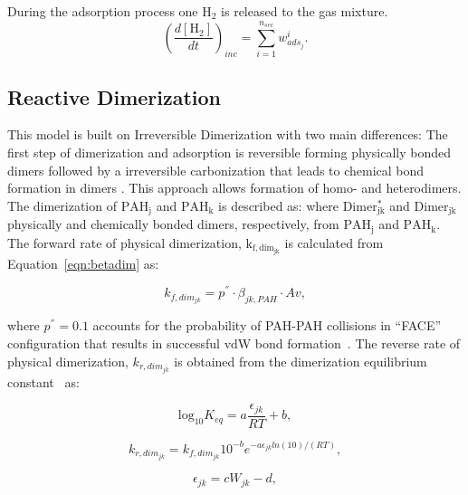 During the adsorption process one $\mathrm{H_2}$ is released to the gas mixture.
\begin{equation}
	\left(
	\frac{d\left[{\mathrm{H_2}}\right]}{dt}
	\right)_{inc}
	= 
	\sum_{i=1}^{n_{sec}}w^i_{ads_j}
	\label{eqn:H2scrub_irrevdim}.
\end{equation}


\subsection{Reactive Dimerization}
This model is built on Irreversible Dimerization with two main differences: The first step of dimerization and adsorption is reversible forming physically bonded dimers followed by a irreversible carbonization that leads to chemical bond formation in dimers \citep{kholghy2018reactive}. This approach allows formation of homo- and heterodimers. The dimerization of $\mathrm{PAH_j}$ and $\mathrm{PAH_k}$ is described as:
\noindent where $\mathrm{Dimer^*_{jk}}$ and $\mathrm{Dimer_{jk}}$ physically and chemically bonded dimers, respectively, from $\mathrm{PAH_j}$ and $\mathrm{PAH_k}$. The forward rate of physical dimerization, $\mathrm{k_{f,dim_{jk}}}$ is calculated from Equation~\eqref{eqn:betadim} as:

\begin{equation}
	k_{f,dim_{jk}}=
	p^{''}\cdot\beta_{jk,PAH}\cdot Av
	\label{eqn:kfphydim_reacdim},
\end{equation}

where ${p^{''}}=0.1$ accounts for the probability of PAH-PAH collisions in “FACE” configuration that results in successful vdW bond formation~\citep{miller1984intermolecular}. The reverse rate of physical dimerization, ${k_{r,dim_{jk}}}$ is obtained from the dimerization equilibrium constant~\citep{miller1991kinetics} as:

\begin{equation}
	\mathrm{log}_{10}K_{eq}=
	a\frac{\epsilon_{jk}}{RT}+b
	\label{eqn:keq_reacdim},
\end{equation}

\begin{equation}
	k_{r,dim_{jk}} = k_{f,dim_{jk}}10^{-b}e^{-a\epsilon_{jk} ln(10)/(RT)}
	\label{eqn:krphydim_reacdim},
\end{equation}

\begin{equation}
	\epsilon_{jk} = cW_{jk} -d
	\label{eqn:epsilon_reacdim},
\end{equation}

